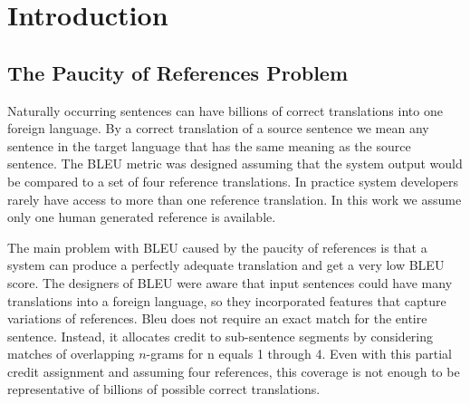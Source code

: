 \section{Introduction}
\label{sec:intro}


\subsection{The Paucity of References Problem}
\label{sec:paucityprob}

Naturally occurring sentences can have billions of correct translations into one foreign language\cite{dreyer-marcu:2012:NAACL-HLT}. 
By a correct translation of a source sentence we mean any sentence in the target language that has the same meaning as the source sentence. 
The BLEU\cite{papineni-02} metric was designed assuming that the system output would be compared to a set of four reference translations. 
In practice system developers rarely have access to more than one  reference translation. 
In this work we assume only one human generated reference is available. 



The main problem with BLEU caused by the paucity of references is that a system can produce a perfectly adequate translation and get a very low BLEU score. 
The designers of BLEU were aware that input sentences could have many translations into a foreign language, so they incorporated features that capture variations of references. 
Bleu does not require an exact match for the entire sentence. 
Instead, it allocates credit to sub-sentence segments by considering matches  of overlapping $n$-grams for   n equals 1 through 4.
Even with this partial credit assignment and assuming four references,  this coverage is not enough to be representative of billions of possible correct translations. 

